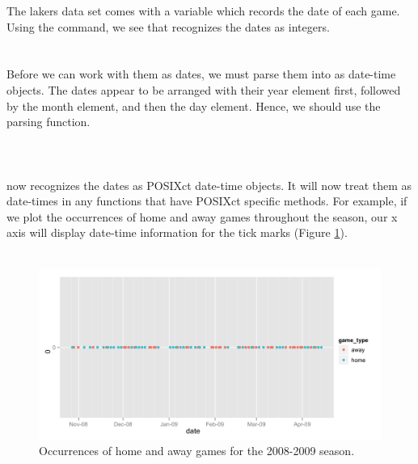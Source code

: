 \documentclass[article]{jss}
\begin{document}
The lakers data set comes with a  variable which records the date of each game. Using the  command, we see that  recognizes the dates as integers.\\

\\
\\

Before we can work with them as dates, we must parse them into  as date-time objects. The dates appear to be arranged with their year element first, followed by the month element, and then the day element. Hence, we should use the  parsing function.\\

\\
\\
\\

 now recognizes the dates as POSIXct date-time objects. It will now treat them as date-times in any functions that have POSIXct specific methods. For example, if we plot the occurrences of home and away games throughout the season, our x axis will display date-time information for the tick marks (Figure \ref{fig:games-date}).\\

\\

\begin{figure}[htpb]
  \centering
  \includegraphics[width=\textwidth]{dates-points.png}        
  \caption{Occurrences of home and away games for the 2008-2009 season.}
  \label{fig:games-date}
\end{figure}
\end{document}
